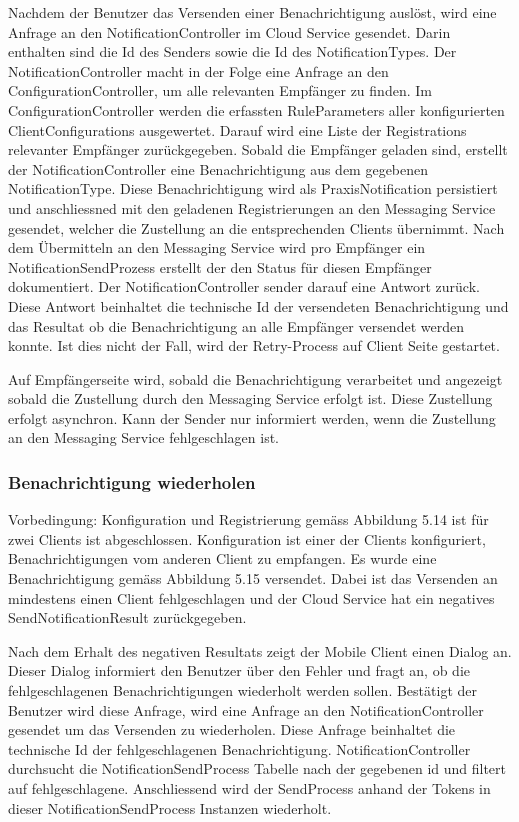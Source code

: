 Nachdem der Benutzer das Versenden einer Benachrichtigung auslöst, wird eine Anfrage an den NotificationController im Cloud Service gesendet.
Darin enthalten sind die Id des Senders sowie die Id des NotificationTypes.
Der NotificationController macht in der Folge eine Anfrage an den ConfigurationController, um alle relevanten Empfänger zu finden.
Im ConfigurationController werden die erfassten RuleParameters aller konfigurierten ClientConfigurations ausgewertet.
Darauf wird eine Liste der Registrations relevanter Empfänger zurückgegeben.
Sobald die Empfänger geladen sind, erstellt der NotificationController eine Benachrichtigung aus dem gegebenen NotificationType.
Diese Benachrichtigung wird als PraxisNotification persistiert und anschliessned
mit den geladenen Registrierungen an den Messaging Service gesendet, welcher die Zustellung an die entsprechenden Clients übernimmt.
Nach dem Übermitteln an den Messaging Service wird pro Empfänger ein NotificationSendProzess erstellt der den Status für diesen Empfänger dokumentiert.
Der NotificationController sender darauf eine Antwort zurück.
Diese Antwort beinhaltet die technische Id der versendeten Benachrichtigung und das Resultat ob die Benachrichtigung an alle Empfänger versendet werden konnte.
Ist dies nicht der Fall, wird der Retry-Process auf Client Seite gestartet.

Auf Empfängerseite wird, sobald die Benachrichtigung verarbeitet und angezeigt sobald die Zustellung durch den Messaging Service erfolgt ist.
Diese Zustellung erfolgt asynchron.
Kann der Sender nur informiert werden, wenn die Zustellung an den Messaging Service fehlgeschlagen ist.

\clearpage
\subsubsection*{Benachrichtigung wiederholen}

Vorbedingung:
Konfiguration und Registrierung gemäss Abbildung 5.14 ist für zwei Clients ist abgeschlossen.
Konfiguration ist einer der Clients konfiguriert, Benachrichtigungen vom anderen Client zu empfangen.
Es wurde eine Benachrichtigung gemäss Abbildung 5.15 versendet.
Dabei ist das Versenden an mindestens einen Client fehlgeschlagen und der Cloud Service hat ein negatives SendNotificationResult zurückgegeben.

Nach dem Erhalt des negativen Resultats zeigt der Mobile Client einen Dialog an.
Dieser Dialog informiert den Benutzer über den Fehler und fragt an, ob die fehlgeschlagenen Benachrichtigungen wiederholt werden sollen.
Bestätigt der Benutzer wird diese Anfrage, wird eine Anfrage an den NotificationController gesendet um das Versenden zu wiederholen.
Diese Anfrage beinhaltet die technische Id der fehlgeschlagenen Benachrichtigung.
NotificationController durchsucht die NotificationSendProcess Tabelle nach der gegebenen id und filtert auf fehlgeschlagene.
Anschliessend wird der SendProcess anhand der Tokens in dieser NotificationSendProcess Instanzen wiederholt.

